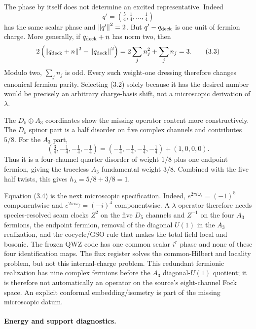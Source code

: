 The phase by itself does not determine an excited representative.  Indeed
\[
 q'=\left(\tfrac54,\tfrac14,\ldots,\tfrac14\right)
\tag{3.2}
\]
has the same scalar phase and $\left\lVert q'\right\rVert^2=2$.  But $q'-q_{\rm deck}$ is one
unit of fermion charge.  More generally, if $q_{\rm deck}+n$ has norm two,
then
\[
 2\left(\left\lVert q_{\rm deck}+n\right\rVert^2-\left\lVert q_{\rm deck}\right\rVert^2\right)
 =2\sum_jn_j^2+\sum_jn_j=3.
\tag{3.3}
\]
Modulo two, $\sum_jn_j$ is odd.  Every such weight-one dressing therefore
changes canonical fermion parity.  Selecting (3.2) solely because it has the
desired number would be precisely an arbitrary charge-basis shift, not a
microscopic derivation of $\lambda$.

The $D_5\oplus A_3$ coordinates show the missing operator content more
constructively.  The $D_5$ spinor part is a half disorder on five complex
channels and contributes $5/8$.  For the $A_3$ part,
\[
 \left(\tfrac34,-\tfrac14,-\tfrac14,-\tfrac14\right)
 =\left(-\tfrac14,-\tfrac14,-\tfrac14,-\tfrac14\right)+(1,0,0,0).
\tag{3.4}
\]
Thus it is a four-channel quarter disorder of weight $1/8$ plus one endpoint
fermion, giving the traceless $A_3$ fundamental weight $3/8$.  Combined with
the five half twists, this gives $h_\lambda=5/8+3/8=1$.

Equation (3.4) is the next microscopic specification.  Indeed,
$e^{2\pi i\omega_s}=(-1)^5$ componentwise and
$e^{2\pi i\omega_f}=(-i)^4$ componentwise.  A $\lambda$ operator therefore
needs species-resolved seam clocks $Z^2$ on the five $D_5$ channels and
$Z^{-1}$ on the four $A_3$ fermions, the endpoint fermion, removal of the
diagonal $U(1)$ in the $A_3$ realization, and the cocycle/GSO rule that makes
the total field local and bosonic.  The frozen QWZ code has one common scalar
$i^r$ phase and none of these four identification maps.  The flux register
solves the common-Hilbert and locality problem, but not this internal-charge
problem.  This redundant fermionic realization has nine complex fermions
before the $A_3$ diagonal-$U(1)$ quotient; it is therefore not automatically
an operator on the source's eight-channel Fock space.  An explicit conformal
embedding/isometry is part of the missing microscopic datum.

\paragraph{Energy and support diagnostics.}

